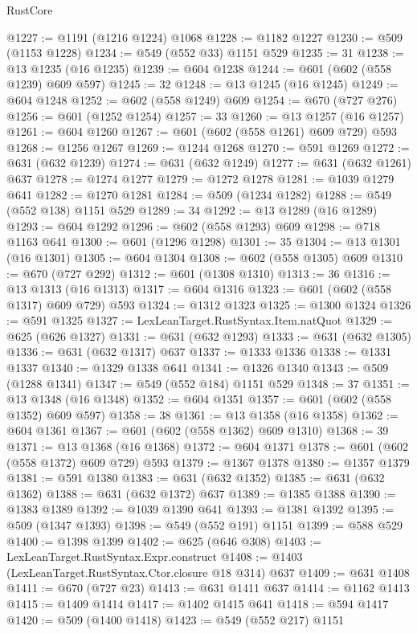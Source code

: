 \begin{lexlean}{RustCore}
\begin{coremodule}
@1227 := @1191 (@1216 @1224) @1068
@1228 := @1182 @1227
@1230 := @509 (@1153 @1228)
@1234 := @549 (@552 @33) @1151 @529
@1235 := 31
@1238 := @13 @1235 (@16 @1235)
@1239 := @604 @1238
@1244 := @601 (@602 (@558 @1239) @609 @597)
@1245 := 32
@1248 := @13 @1245 (@16 @1245)
@1249 := @604 @1248
@1252 := @602 (@558 @1249) @609
@1254 := @670 (@727 @276)
@1256 := @601 (@1252 @1254)
@1257 := 33
@1260 := @13 @1257 (@16 @1257)
@1261 := @604 @1260
@1267 := @601 (@602 (@558 @1261) @609 @729) @593
@1268 := @1256 @1267
@1269 := @1244 @1268
@1270 := @591 @1269
@1272 := @631 (@632 @1239)
@1274 := @631 (@632 @1249)
@1277 := @631 (@632 @1261) @637
@1278 := @1274 @1277
@1279 := @1272 @1278
@1281 := @1039 @1279 @641
@1282 := @1270 @1281
@1284 := @509 (@1234 @1282)
@1288 := @549 (@552 @138) @1151 @529
@1289 := 34
@1292 := @13 @1289 (@16 @1289)
@1293 := @604 @1292
@1296 := @602 (@558 @1293) @609
@1298 := @718 @1163 @641
@1300 := @601 (@1296 @1298)
@1301 := 35
@1304 := @13 @1301 (@16 @1301)
@1305 := @604 @1304
@1308 := @602 (@558 @1305) @609
@1310 := @670 (@727 @292)
@1312 := @601 (@1308 @1310)
@1313 := 36
@1316 := @13 @1313 (@16 @1313)
@1317 := @604 @1316
@1323 := @601 (@602 (@558 @1317) @609 @729) @593
@1324 := @1312 @1323
@1325 := @1300 @1324
@1326 := @591 @1325
@1327 := LexLeanTarget.RustSyntax.Item.natQuot
@1329 := @625 (@626 @1327)
@1331 := @631 (@632 @1293)
@1333 := @631 (@632 @1305)
@1336 := @631 (@632 @1317) @637
@1337 := @1333 @1336
@1338 := @1331 @1337
@1340 := @1329 @1338 @641
@1341 := @1326 @1340
@1343 := @509 (@1288 @1341)
@1347 := @549 (@552 @184) @1151 @529
@1348 := 37
@1351 := @13 @1348 (@16 @1348)
@1352 := @604 @1351
@1357 := @601 (@602 (@558 @1352) @609 @597)
@1358 := 38
@1361 := @13 @1358 (@16 @1358)
@1362 := @604 @1361
@1367 := @601 (@602 (@558 @1362) @609 @1310)
@1368 := 39
@1371 := @13 @1368 (@16 @1368)
@1372 := @604 @1371
@1378 := @601 (@602 (@558 @1372) @609 @729) @593
@1379 := @1367 @1378
@1380 := @1357 @1379
@1381 := @591 @1380
@1383 := @631 (@632 @1352)
@1385 := @631 (@632 @1362)
@1388 := @631 (@632 @1372) @637
@1389 := @1385 @1388
@1390 := @1383 @1389
@1392 := @1039 @1390 @641
@1393 := @1381 @1392
@1395 := @509 (@1347 @1393)
@1398 := @549 (@552 @191) @1151
@1399 := @588 @529
@1400 := @1398 @1399
@1402 := @625 (@646 @308)
@1403 := LexLeanTarget.RustSyntax.Expr.construct
@1408 := @1403 (LexLeanTarget.RustSyntax.Ctor.closure @18 @314) @637
@1409 := @631 @1408
@1411 := @670 (@727 @23)
@1413 := @631 @1411 @637
@1414 := @1162 @1413
@1415 := @1409 @1414
@1417 := @1402 @1415 @641
@1418 := @594 @1417
@1420 := @509 (@1400 @1418)
@1423 := @549 (@552 @217) @1151

\end{coremodule}
\end{lexlean}
